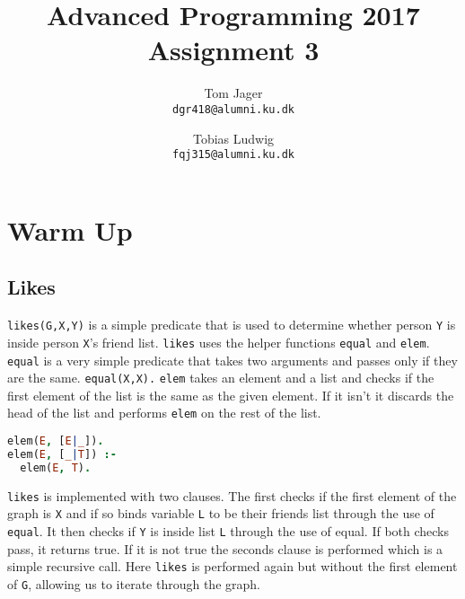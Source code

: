 \documentclass{article}
\title{Advanced Programming 2017\\Assignment 3}
\author{
Tom Jager\\
\texttt{dgr418@alumni.ku.dk}
\and
Tobias Ludwig\\
\texttt{fqj315@alumni.ku.dk}}
\begin{document}
\maketitle
\section{Warm Up}
\subsection{Likes}
\texttt{likes(G,X,Y)} is a simple predicate that is used to determine whether person \texttt{Y} is inside person \texttt{X}'s friend list. \texttt{likes} uses the helper functions \texttt{equal} and \texttt{elem}. \texttt{equal} is a very simple predicate that takes two arguments and passes only if they are the same.
\bigbreak
\texttt{equal(X,X).}
\bigbreak
\texttt{elem} takes an element and a list and checks if the first element of the list is the same as the given element. If it isn't it discards the head of the list and performs \texttt{elem} on the rest of the list.
\begin{lstlisting}[language=Prolog]
elem(E, [E|_]).
elem(E, [_|T]) :-
  elem(E, T).
\end{lstlisting}

\texttt{likes} is implemented with two clauses. The first checks if the first element of the graph is \texttt{X} and if so binds variable \texttt{L} to be their friends list through the use of \texttt{equal}. It then checks if \texttt{Y} is inside list \texttt{L} through the use of equal. If both checks pass, it returns true. If it is not true the seconds clause is performed which is a simple recursive call. Here \texttt{likes} is performed again but without the first element of \texttt{G}, allowing us to iterate through the graph. 
\end{document}
